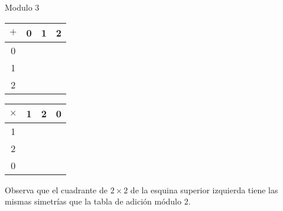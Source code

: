 \begin{ejercicio}
 Modulo 3

\begin{tabular}{|c||c|c|c|} 
 \hline
  $\plus$ & 0 & 1 & 2\\ 
  \hline
  \hline
  0 &  & & \\ 
  \hline
  1 &  & & \\
    \hline
  2 &  & & \\ 
  \hline
\end{tabular}
\hspace{2cm}
\begin{tabular}{|c||c|c|c|} 
 \hline
  $\times$ & 1 & 2 & 0\\ 
  \hline
  \hline
  1 &  & & \\ 
  \hline
  2 &  & & \\
    \hline
  0 &  & & \\ 
  \hline
\end{tabular}

Observa que el cuadrante de $2\times 2$ de la esquina superior izquierda tiene las mismas simetrías que la tabla de adición módulo $2$.
\end{ejercicio}


